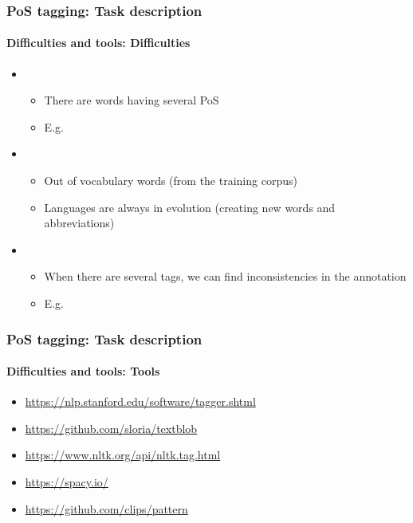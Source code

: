 \documentclass[xcolor=table]{beamer}
\begin{document}
\begin{frame}
\frametitle{PoS tagging: Task description}
\framesubtitle{Difficulties and tools: Difficulties}

\begin{itemize}
	\item {}
	\begin{itemize}
		\item There are words having several PoS
		\item E.g. 
	\end{itemize}
	\item {}
	\begin{itemize}
		\item Out of vocabulary words (from the training corpus)
		\item Languages are always in evolution (creating new words and abbreviations)
	\end{itemize}
	\item {}
	\begin{itemize}
		\item When there are several tags, we can find inconsistencies in the annotation
		\item E.g. 
	\end{itemize}
\end{itemize}

\end{frame}

\begin{frame}
\frametitle{PoS tagging: Task description}
\framesubtitle{Difficulties and tools: Tools}

\begin{itemize}
	\item \url{https://nlp.stanford.edu/software/tagger.shtml}
	\item \url{https://github.com/sloria/textblob}
	\item \url{https://www.nltk.org/api/nltk.tag.html}
	\item \url{https://spacy.io/}
	\item \url{https://github.com/clips/pattern}
\end{itemize}

\end{frame}
\end{document}
